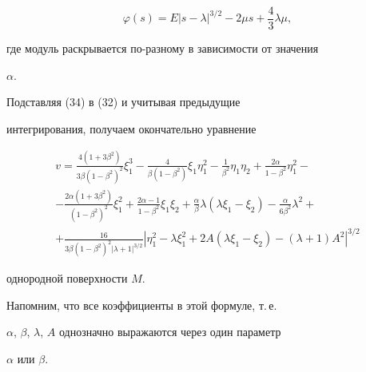 \begin{equation}


 \varphi(s) = E | s - \lambda |^{3/2} - 2 \mu s + \frac 43 \lambda \mu,


\end{equation}


где модуль раскрывается по-разному в зависимости от значения 


$ \alpha $.


 


Подставляя (34) в (32) и учитывая предыдущие 


интегрирования, получаем окончательно уравнение


\begin{multline*}


v = 


 \frac {4( 1+ 3 \beta^2) }{ 3\beta( 1- \beta^2)^2} \xi_1^3 - 


 \frac 4{ \beta( 1- \beta^2)} \xi_1 \eta^2_1 


- \frac 1{\beta^2} \eta_1 \eta_2 + 


 \frac { 2 \alpha }{ 1 - \beta^2} \eta_1^2 -  \\


%


- \frac { 2 \alpha( 1+ 3 \beta^2) }{ ( 1- \beta^2)^2} \xi_1^2 +


 \frac { 2 \alpha - 1 }{ 1- \beta^2} \xi_1 \xi_2 +


\frac { \alpha }{ \beta } \lambda (\lambda \xi_1 - \xi_2 ) -


 \frac { \alpha }{ 6 \beta^2 } \lambda^2 +


\\


+ \frac { 16 }{ 3 \beta ( 1- \beta^2)^2 | \lambda + 1 |^{3/2} } 


 \left| \eta_1^2 - \lambda \xi_1^2 + 2 A ( \lambda \xi_1 - \xi_2) -


 ( \lambda + 1) A^2 \right|^{3/2}


\end{multline*}


однородной поверхности $M$.





Напомним, что все коэффициенты в этой формуле, т.\,е. 


$ \alpha$, $\beta$, $\lambda$, $A $ однозначно выражаются через один параметр


$ \alpha $ или $ \beta $.








